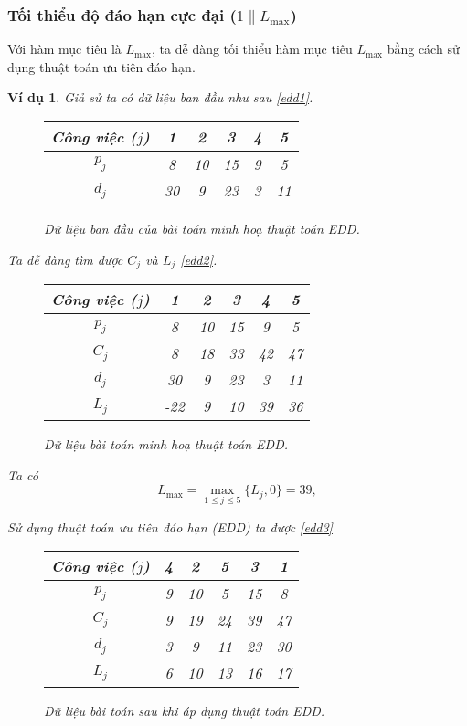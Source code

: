 \documentclass[12pt,a4paper]{report}
\newtheorem{vd}{Ví dụ}
\begin{document}
\subsubsection*{Tối thiểu độ đáo hạn cực đại ($1 \| L_{\max}$)}
Với hàm mục tiêu là $L_{\max}$, ta dễ dàng tối thiểu hàm mục tiêu $L_{\max}$ bằng cách sử dụng thuật toán ưu tiên đáo hạn.

\begin{vd}
Giả sử ta có dữ liệu ban đầu như sau \eqref{edd1}.
\begin{figure}[h!]
\centering
	\begin{tabular}{|c | c c c c c |} 
	\hline
	Công việc ($j$) & 1 & 2 & 3 & 4 & 5 \\
	\hline\hline
	$p_j$ & 8 & 10 & 15 & 9 & 5 \\
	$d_j$ & 30 & 9 & 23 & 3 & 11 \\
	\hline
	\end{tabular}
	\caption{\label{edd1} Dữ liệu ban đầu của bài toán minh hoạ thuật toán EDD.}
\end{figure}

Ta dễ dàng tìm được $C_j$ và $L_j$ \eqref{edd2}.
\begin{figure}[h!]
\centering
	\begin{tabular}{|c | c c c c c |} 
	\hline
	Công việc ($j$) & 1 & 2 & 3 & 4 & 5 \\
	\hline\hline
	$p_j$ & 8 & 10 & 15 & 9 & 5 \\
	$C_j$ & 8 & 18 & 33 & 42 & 47 \\
	$d_j$ & 30 & 9 & 23 & 3 & 11 \\
	$L_j$ & -22 & 9 & 10 & 39 & 36 \\
	\hline
	\end{tabular}
	\caption{\label{edd2} Dữ liệu bài toán minh hoạ thuật toán EDD.}
\end{figure}

Ta có
\begin{equation*}
	L_{\max} = \max _{1 \leq j \leq 5} \{L_j, 0\} = 39,
\end{equation*}

Sử dụng thuật toán ưu tiên đáo hạn (EDD) ta được \eqref{edd3}

\begin{figure}[h!]
\centering
	\begin{tabular}{|c | c c c c c |} 
	\hline
	Công việc ($j$) & 4 & 2 & 5 & 3 & 1 \\
	\hline\hline
	$p_j$ & 9 & 10 & 5 & 15 & 8 \\
	$C_j$ & 9 & 19 & 24 & 39 & 47 \\
	$d_j$ & 3 & 9 & 11 & 23 & 30 \\
	$L_j$ & 6 & 10 & 13 & 16 & 17 \\
	\hline
	\end{tabular}
	\caption{\label{edd3} Dữ liệu bài toán sau khi áp dụng thuật toán EDD.}
\end{figure}


\end{vd}
\end{document}
